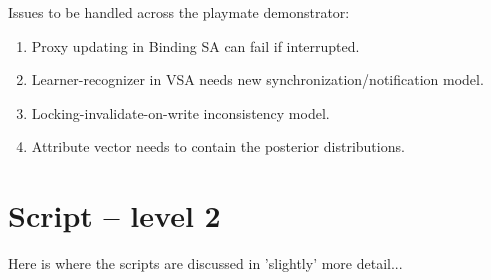 \documentclass{article}
\begin{document}
\noindent
Issues to be handled across the playmate demonstrator:
\begin{enumerate}
\item Proxy updating in Binding SA can fail if interrupted.
\item Learner-recognizer in VSA needs new synchronization/notification
  model.
\item Locking-invalidate-on-write inconsistency model.
\item Attribute vector needs to contain the posterior distributions.
\end{enumerate}




\section{Script -- level 2}
Here is where the scripts are discussed in 'slightly' more detail...
\end{document}
